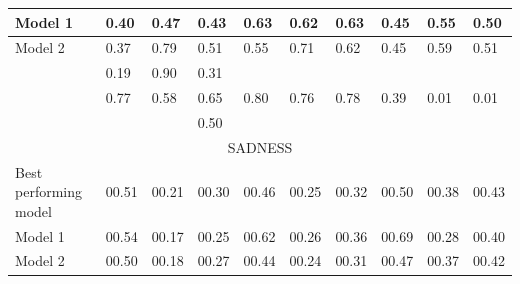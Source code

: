 \documentclass[11pt]{article}
\begin{document}
\begin{table}[!htbp]
\begin{tabular}{|l|l|l|l|l|l|l|l|l|l|}
\hline
    \tiny{Model 1} & 
    \footnotesize{0.40} & 
    \footnotesize{0.47} & 
    \footnotesize{0.43} & 
    \footnotesize{0.63} & 
    \footnotesize{0.62} & 
    \footnotesize{0.63} & 
    \footnotesize{0.45} & 
    \footnotesize{0.55} & 
    \footnotesize{0.50} \\ 

\hline
    \tiny{Model 2} & 
    \footnotesize{0.37} & 
    \footnotesize{0.79} & 
    \footnotesize{0.51} & 
    \footnotesize{0.55} & 
    \footnotesize{0.71} & 
    \footnotesize{0.62} & 
    \footnotesize{0.45} & 
    \footnotesize{0.59} & 
    \footnotesize{0.51} \\ 

\hline 
    \tiny{\cite{strapparava2008learning} } &
    \footnotesize{0.19} & 
    \footnotesize{0.90} & 
    \footnotesize{0.31} &
    &
    &
    &
    &
    &
    \\

\hline
    \tiny{\cite{kim2010evaluation}} &
    \footnotesize{0.77} & 
    \footnotesize{0.58} & 
    \footnotesize{0.65} &
    \footnotesize{0.80} & 
    \footnotesize{0.76} & 
    \footnotesize{0.78} &
    \footnotesize{0.39} & 
    \footnotesize{0.01} & 
    \footnotesize{0.01} \\
    
\hline
    \tiny{\cite{danisman2008feeler}} &
    \footnotesize{} & 
    \footnotesize{} & 
    \footnotesize{0.50} &
    \footnotesize{} & 
    \footnotesize{} & 
    \footnotesize{} &
    \footnotesize{} & 
    \footnotesize{} & 
    \footnotesize{} \\
    
\hline
    \multicolumn{10}{|c|}{{SADNESS}} \\ 
    
\hline
    \tiny{Best performing model} & 
    \footnotesize{00.51} & 
    \footnotesize{00.21} & 
    \footnotesize{00.30} & 
    \footnotesize{00.46} & 
    \footnotesize{00.25} & 
    \footnotesize{00.32} & 
    \footnotesize{00.50} & 
    \footnotesize{00.38} & 
    \footnotesize{00.43} \\ 

\hline
    \tiny{Model 1} & 
    \footnotesize{00.54} & 
    \footnotesize{00.17} & 
    \footnotesize{00.25} & 
    \footnotesize{00.62} & 
    \footnotesize{00.26} & 
    \footnotesize{00.36} & 
    \footnotesize{00.69} & 
    \footnotesize{00.28} & 
    \footnotesize{00.40} \\ 

\hline
    \tiny{Model 2} & 
    \footnotesize{00.50} & 
    \footnotesize{00.18} & 
    \footnotesize{00.27} & 
    \footnotesize{00.44} & 
    \footnotesize{00.24} & 
    \footnotesize{00.31} & 
    \footnotesize{00.47} & 
    \footnotesize{00.37} & 
    \footnotesize{00.42} \\ 


\end{tabular}
\end{table}
\end{document}
